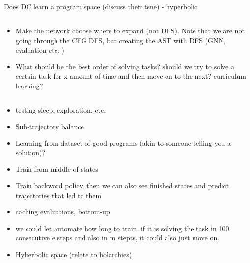 
Does DC learn a program space (discuss their tsne)
- hyperbolic













\subsection{}
\begin{itemize}
    \item Make the network choose where to expand (not DFS). Note that we are not going through the CFG DFS, but creating the AST with DFS (GNN, evaluation etc. )
    \item What should be the best order of solving tasks? should we try to solve a certain task for x amount of time and then move on to the next? curriculum learning? 

\end{itemize}


\subsection{}
\begin{itemize}
    \item testing sleep, exploration, etc. 
    \item Sub-trajectory balance
    \item Learning from dataset of good programs (akin to someone telling you a solution)? 
    \item Train from middle of states
    \item Train backward policy, then we can also see finished states and predict trajectories that led to them
    \item caching evaluations, bottom-up
    \item we could let automate how long to train. if it is solving the task in 100 consecutive e steps and also in m stepts, it could also just move on. 
    \item Hyberbolic space (relate to holarchies)
\end{itemize}






























